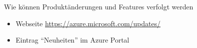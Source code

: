 \begin{flashcard}[\ ]{Wie können Produktänderungen und Features verfolgt werden}
    \begin{itemize}
        \item Webseite \href{https://azure.microsoft.com/updates/}{https://azure.microsoft.com/updates/}
        \item Eintrag ``Neuheiten'' im Azure Portal
    \end{itemize}

\end{flashcard}
